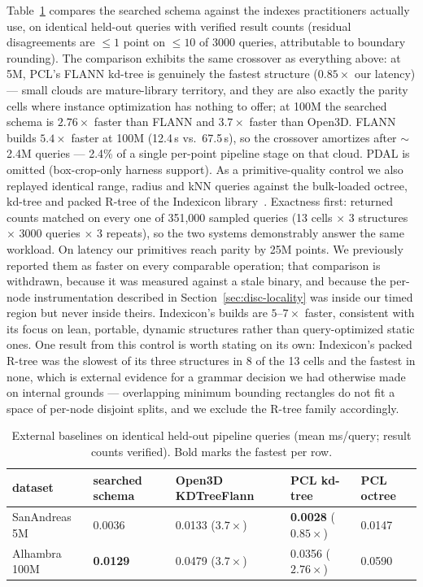 Table~\ref{tab:frameworks} compares the searched schema against the indexes practitioners actually use, on identical held-out queries with verified result counts (residual disagreements are $\leq 1$ point on $\leq 10$ of 3000 queries, attributable to boundary rounding). The comparison exhibits the same crossover as everything above: at 5M, PCL's FLANN kd-tree is genuinely the fastest structure ($0.85\times$ our latency) --- small clouds are mature-library territory, and they are also exactly the parity cells where instance optimization has nothing to offer; at 100M the searched schema is $2.76\times$ faster than FLANN and $3.7\times$ faster than Open3D. FLANN builds $5.4\times$ faster at 100M (12.4\,s vs.\ 67.5\,s), so the crossover amortizes after $\sim$2.4M queries --- 2.4\% of a single per-point pipeline stage on that cloud. PDAL is omitted (box-crop-only harness support). As a primitive-quality control we also replayed identical range, radius and kNN queries against the bulk-loaded octree, kd-tree and packed R-tree of the Indexicon library~\cite{indexicon2026}. Exactness first: returned counts matched on every one of 351{,}000 sampled queries (13 cells $\times$ 3 structures $\times$ 3000 queries $\times$ 3 repeats), so the two systems demonstrably answer the same workload. On latency our primitives reach parity by 25M points. We previously reported them as faster on every comparable operation; that comparison is withdrawn, because it was measured against a stale binary, and because the per-node instrumentation described in Section~\ref{sec:disc-locality} was inside our timed region but never inside theirs. Indexicon's builds are $5$--$7\times$ faster, consistent with its focus on lean, portable, dynamic structures rather than query-optimized static ones. One result from this control is worth stating on its own: Indexicon's packed R-tree was the slowest of its three structures in 8 of the 13 cells and the fastest in none, which is external evidence for a grammar decision we had otherwise made on internal grounds --- overlapping minimum bounding rectangles do not fit a space of per-node disjoint splits, and we exclude the R-tree family accordingly.

\begin{table}[t]
  \centering
  \caption{External baselines on identical held-out pipeline queries (mean ms/query; result counts verified). Bold marks the fastest per row.}
  \label{tab:frameworks}
  \small
  \begin{tabular}{lllll}
    \toprule
    dataset & searched schema & Open3D KDTreeFlann & PCL kd-tree & PCL octree \\
    \midrule
    SanAndreas 5M  & 0.0036 & 0.0133 ($3.7\times$) & \textbf{0.0028} ($0.85\times$) & 0.0147 \\
    Alhambra 100M  & \textbf{0.0129} & 0.0479 ($3.7\times$) & 0.0356 ($2.76\times$) & 0.0590 \\
    \bottomrule
  \end{tabular}
\end{table}

